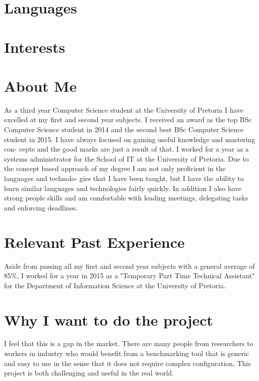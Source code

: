\documentclass[11pt,a4paper,sans]{moderncv} %
\begin{document}
\section{Languages}



\section{Interests}
\renewcommand{\listitemsymbol}{-~} %

\section{About Me}
As a third year Computer Science student at the University of Pretoria I have excelled at my first and second
year subjects. I received an award as the top BSc Computer Science student in 2014 and the second best BSc
Computer Science student in 2015. I have always focused on gaining useful knowledge and mastering con-
cepts and the good marks are just a result of that. I worked for a year as a systems administrator for the School
of IT at the University of Pretoria.
Due to the concept based approach of my degree I am not only proficient in the languages and technolo-
gies that I have been taught, but I have the ability to learn similar languages and technologies fairly quickly.
In addition I also have strong people skills and am comfortable with leading meetings, delegating tasks and
enforcing deadlines.

\section{Relevant Past Experience}
Aside from passing all my first and second year subjects with a general average of 85\%,
I worked for a year in 2015 as a "Temporary Part Time Technical Assistant" for the Department of Information Science
at the University of Pretoria.

\section{Why I want to do the project}
I feel that this is a gap in the market. There are many people from researchers to workers in industry who would benefit from
a benchmarking tool that is generic and easy to use in the sense that it does not require complex configuration. This project is both
challenging and useful in the real world.
\end{document}
